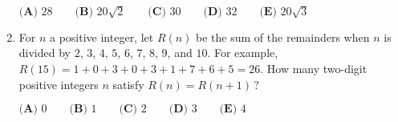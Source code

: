 \documentclass{article}
\begin{document}
\begin{enumerate}[label=\arabic*., itemsep=0.5em]
$\textbf{(A) } 28 \qquad \textbf{(B) } 20\sqrt{2} \qquad \textbf{(C) } 30 \qquad \textbf{(D) } 32 \qquad \textbf{(E) } 20\sqrt{3}$\par \vspace{0.5em}\item For $n$ a positive integer, let $R(n)$ be the sum of the remainders when $n$ is divided by $2$, $3$, $4$, $5$, $6$, $7$, $8$, $9$, and $10$. For example, $R(15) = 1+0+3+0+3+1+7+6+5=26$. How many two-digit positive integers $n$ satisfy $R(n) = R(n+1)\,?$

$\textbf{(A) }0\qquad\textbf{(B) }1\qquad\textbf{(C) }2\qquad\textbf{(D) }3\qquad\textbf{(E) }4$\par \vspace{0.5em}\end{enumerate}
\end{document}
